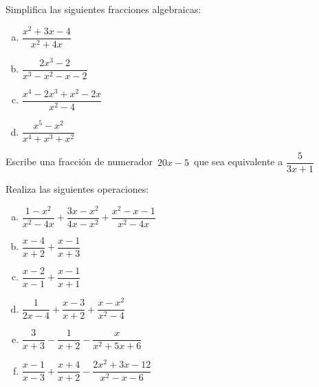 \begin{mipropuesto}

Simplifica las siguientes fracciones algebraicas:

\begin{multicols}{2}
\begin{enumerate}[a) ]
\item $\dfrac{x^2+3x-4}{x^2+4x}$
\item $\dfrac{2x^3-2}{x^3-x^2-x-2}$
\item $\dfrac{x^4-2x^3+x^2-2x}{x^2-4}$
\item $\dfrac{x^5-x^2}{x^4+x^3+x^2}$	
\end{enumerate}	
\end{multicols}
\vspace{1mm}
\end{mipropuesto}

\vspace{-8mm}
\begin{flushright}
	\begin{footnotesize} \textcolor{gris}{}	\end{footnotesize}
\end{flushright}

\begin{mipropuesto}

Escribe una fracción de numerador $\, 20x-5\, $ que sea equivalente a $\dfrac{5}{3x+1}$
\end{mipropuesto}

\vspace{-8mm}
\begin{flushright}
	\begin{footnotesize} \textcolor{gris}{}	\end{footnotesize}
\end{flushright}


\begin{mipropuesto}

Realiza las siguientes operaciones:

\begin{multicols}{2}
\begin{enumerate}[a) ]
\item $\dfrac{1-x^2}{x^2-4x}+\dfrac{3x-x^2}{4x-x^2}+\dfrac{x^2-x-1}{x^2-4x}$
\item $\dfrac{x-4}{x+2}+\dfrac{x-1}{x+3}$
\item $\dfrac{x-2}{x-1}+\dfrac{x-1}{x+1}$
\item $\dfrac{1}{2x-4}+\dfrac{x-3}{x+2}+\dfrac{x-x^2}{x^2-4}$	
\item $\dfrac{3}{x+3}-\dfrac{1}{x+2}-\dfrac{x}{x^2+5x+6}$
\item $\dfrac{x-1}{x-3}+\dfrac{x+4}{x+2}-\dfrac{2x^2+3x-12}{x^2-x-6}$
\end{enumerate}	
\end{multicols}
\vspace{1mm}
\end{mipropuesto}

